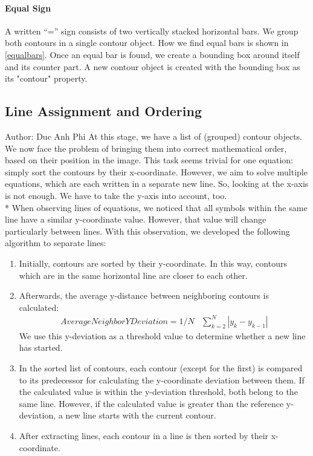 \documentclass[11pt]{article}
\begin{document}
	\paragraph{Equal Sign}
	A written “=” sign consists of two vertically stacked horizontal bars. We group both contours in a single contour object. How we find equal bars is shown in \ref{equalbars}. Once an equal bar is found, we create a bounding box around itself and its counter part.
	A new contour object is created with the bounding box as its "contour" property.
	
	
	\subsection{Line Assignment and Ordering}
	\small{Author: Duc Anh Phi} \newline \newline
	At this stage, we have a list of (grouped) contour objects. We now face the problem of bringing them into correct mathematical order, based on their position in the image.
	This task seems trivial for one equation: simply sort the contours by their x-coordinate.
	However, we aim to solve multiple equations, which are each written in a separate new line.
	So, looking at the x-axis is not enough. We have to take the y-axis into account, too.\\* When observing lines of equations, we noticed that all symbols within the same line have a similar y-coordinate value. However, that value will change particularly between lines. With this observation, we developed the following algorithm to separate lines:
	\\
	\begin{enumerate}
		\item Initially, contours are sorted by their y-coordinate. In this way, contours which are in the same horizontal line are closer to each other.
		\item Afterwards, the average y-distance between neighboring contours is calculated:\\
		\begin{align}
		Average Neighbor Y Deviation = 1/N &\sum\limits_{k=2}^{N} \left|y_{k} - y_{k-1}\right|
		\end{align}
		We use this y-deviation as a threshold value to determine whether a new line has started.
		\item In the sorted list of contours, each contour (except for the first) is compared to its predecessor for calculating the y-coordinate deviation between them. If the calculated value is within the y-deviation threshold, both belong to the same line. However, if the calculated value is greater than the reference y-deviation, a new line starts with the current contour.
		\item After extracting lines, each contour in a line is then sorted by their x-coordinate.
	\end{enumerate}
	
\end{document}
